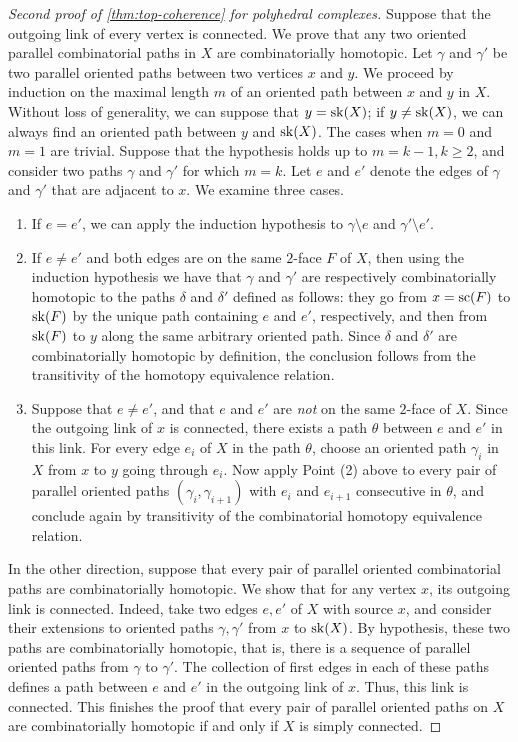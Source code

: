 \begin{proof}[Second proof of {\cref{thm:top-coherence}} for polyhedral complexes]
    Suppose that the outgoing link of every vertex is connected. 
    We prove that any two oriented parallel combinatorial paths in $X$ are combinatorially homotopic. 
    Let $\gamma$ and $\gamma'$ be two parallel oriented paths between two vertices $x$ and $y$. 
    We proceed by induction on the maximal length $m$ of an oriented path between $x$ and $y$ in $X$. 
    Without loss of generality, we can suppose that $y=\mathrm{sk}(X)$; if $y\neq\mathrm{sk}(X)$, we can always find an oriented path between $y$ and $\mathrm{sk}(X)$.
    The cases when $m=0$ and $m=1$ are trivial. 
    Suppose that the hypothesis holds up to $m=k-1, k\geq 2$, and consider two paths $\gamma$ and $\gamma'$ for which $m=k$. 
    Let $e$ and $e'$ denote the edges of $\gamma$ and $\gamma'$ that are adjacent to $x$. 
    We examine three cases.
    \begin{enumerate}
        \item If $e=e'$, we can apply the induction hypothesis to $\gamma \setminus e$ and $\gamma' \setminus e'$. 
        \item If $e \neq e'$ and both edges are on the same $2$-face $F$ of $X$, then using the induction hypothesis we have that $\gamma$ and $\gamma'$ are respectively combinatorially homotopic to the paths $\delta$ and $\delta'$ defined as follows: they go from $x=\mathrm{sc}(F)$ to $\mathrm{sk}(F)$ by the unique path containing $e$ and $e'$, respectively, and then from $\mathrm{sk}(F)$ to $y$ along the same arbitrary oriented path. 
        Since $\delta$ and $\delta'$ are combinatorially homotopic by definition, the conclusion follows from the transitivity of the homotopy equivalence relation. 
        \item Suppose that $e\neq e'$, and that $e$ and $e'$ are \emph{not} on the same $2$-face of $X$. 
        Since the outgoing link of $x$ is connected, there exists a path $\theta$ between $e$ and $e'$ in this link. 
        For every edge $e_i$ of $X$ in the path $\theta$, choose an oriented path $\gamma_i$ in $X$ from $x$ to $y$ going through $e_i$. 
        Now apply Point (2) above to every pair of parallel oriented paths $(\gamma_i, \gamma_{i+1})$ with $e_i$ and $e_{i+1}$ consecutive in $\theta$, and conclude again by transitivity of the combinatorial homotopy equivalence relation. 
    \end{enumerate}

    In the other direction, suppose that every pair of parallel oriented combinatorial paths are combinatorially homotopic. 
    We show that for any vertex $x$, its outgoing link is connected. 
    Indeed, take two edges $e,e'$ of $X$ with source $x$, and consider their extensions to oriented paths $\gamma, \gamma'$ from $x$ to $\mathrm{sk}(X)$. 
    By hypothesis, these two paths are combinatorially homotopic, that is, there is a sequence of parallel oriented paths from $\gamma$ to $\gamma'$. 
    The collection of first edges in each of these paths defines a path between $e$ and $e'$ in the outgoing link of $x$. 
    Thus, this link is connected. 
    This finishes the proof that every pair of parallel oriented paths on $X$ are combinatorially homotopic if and only if $X$ is simply connected.


\end{proof}
